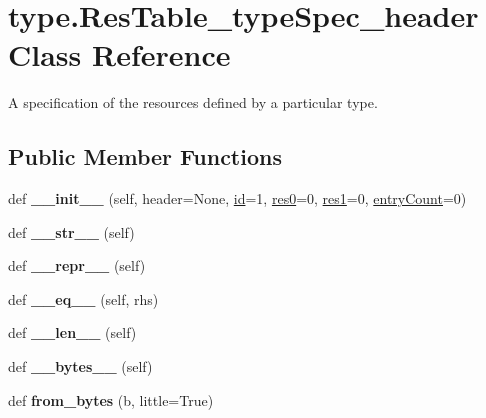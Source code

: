 \hypertarget{classtype_1_1ResTable__typeSpec__header}{}\section{type.\+Res\+Table\+\_\+type\+Spec\+\_\+header Class Reference}
\label{classtype_1_1ResTable__typeSpec__header}


A specification of the resources defined by a particular type.  


\subsection*{Public Member Functions}
\begin{DoxyCompactItemize}
\item 
\mbox{\label{classtype_1_1ResTable__typeSpec__header_a6b5c60bf9a8a3d14dfb5fa45d312f069}} 
def {\bfseries \+\_\+\+\_\+init\+\_\+\+\_\+} (self, header=None, \mbox{\hyperlink{classtype_1_1ResTable__typeSpec__header_aad59ee5d1b955fa94928d17fd38ce69e}{id}}=1, \mbox{\hyperlink{classtype_1_1ResTable__typeSpec__header_a3e65b1cd226cc73ec5d8f06bf3436834}{res0}}=0, \mbox{\hyperlink{classtype_1_1ResTable__typeSpec__header_a7242e42ab27ef430881ca79ac8dac663}{res1}}=0, \mbox{\hyperlink{classtype_1_1ResTable__typeSpec__header_ac508f83ab6f145fe79f7f527b8924567}{entry\+Count}}=0)
\item 
\mbox{\label{classtype_1_1ResTable__typeSpec__header_ab6944602e0d8e2c8ad9ed3c742a6d9a0}} 
def {\bfseries \+\_\+\+\_\+str\+\_\+\+\_\+} (self)
\item 
\mbox{\label{classtype_1_1ResTable__typeSpec__header_af847e81c7b52edc07e11c1391890c2e5}} 
def {\bfseries \+\_\+\+\_\+repr\+\_\+\+\_\+} (self)
\item 
\mbox{\label{classtype_1_1ResTable__typeSpec__header_adcee642df825c5e08a5961073cee7e3f}} 
def {\bfseries \+\_\+\+\_\+eq\+\_\+\+\_\+} (self, rhs)
\item 
\mbox{\label{classtype_1_1ResTable__typeSpec__header_a10f48c791523ad6ceea96553290642a2}} 
def {\bfseries \+\_\+\+\_\+len\+\_\+\+\_\+} (self)
\item 
\mbox{\label{classtype_1_1ResTable__typeSpec__header_adb63d48ba1f7d3c61ca1498bcd7504fb}} 
def {\bfseries \+\_\+\+\_\+bytes\+\_\+\+\_\+} (self)
\item 
\mbox{\label{classtype_1_1ResTable__typeSpec__header_acf7001a34db0c0b338d6774aab78f439}} 
def {\bfseries from\+\_\+bytes} (b, little=True)
\end{DoxyCompactItemize}

